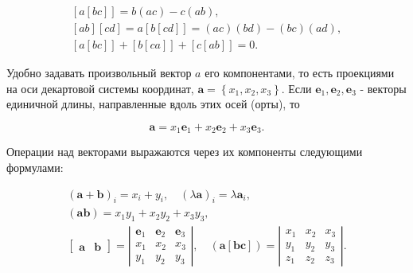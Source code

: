 \documentclass[10pt]{article}
\begin{document}
\[

\begin{gathered}

{[a[b c]]=b(a c)-c(a b),} \\

{[a b][c d]=a[b[c d]]=(a c)(b d)-(b c)(a d),} \\

{[a[b c]]+[b[c a]]+[c[a b]]=0 .}

\end{gathered}

\]



Удобно задавать произвольный вектор $a$ его компонентами, то есть проекциями на оси декартовой системы координат, $\boldsymbol{a}=\left\{x_{1}, x_{2}, x_{3}\right\}$. Если $\boldsymbol{e}_{1}, \boldsymbol{e}_{2}, \boldsymbol{e}_{3}$ - векторы единичной длины, направленные вдоль этих осей (орты), то



\[

\boldsymbol{a}=x_{1} \boldsymbol{e}_{1}+x_{2} \boldsymbol{e}_{2}+x_{3} \boldsymbol{e}_{3} .

\]



Операции над векторами выражаются через их компоненты следующими формулами:



\[

\begin{gathered}

(\boldsymbol{a}+\boldsymbol{b})_{i}=x_{i}+y_{i}, \quad(\lambda \boldsymbol{a})_{i}=\lambda \boldsymbol{a}_{i}, \\

(\boldsymbol{a} \boldsymbol{b})=x_{1} y_{1}+x_{2} y_{2}+x_{3} y_{3}, \\

{\left[\begin{array}{ll}

\boldsymbol{a} & \boldsymbol{b}

\end{array}\right]=\left|\begin{array}{lll}

\boldsymbol{e}_{1} & \boldsymbol{e}_{2} & \boldsymbol{e}_{3} \\

x_{1} & x_{2} & x_{3} \\

y_{1} & y_{2} & y_{3}

\end{array}\right|, \quad(\boldsymbol{a}[\boldsymbol{b} \boldsymbol{c}])=\left|\begin{array}{lll}

x_{1} & x_{2} & x_{3} \\

y_{1} & y_{2} & y_{3} \\

z_{1} & z_{2} & z_{3}

\end{array}\right| .}

\end{gathered}

\]
\end{document}

